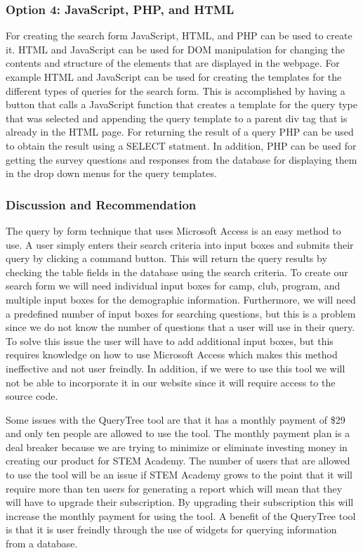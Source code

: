 \documentclass[letterpaper,10pt,serif, draftclsnofoot,onecolumn, compsoc, titlepage]{IEEEtran}
\begin{document}
\subsubsection{Option 4: JavaScript, PHP, and HTML}
For creating the search form JavaScript, HTML, and PHP can be used to create it. HTML and JavaScript can be used for DOM manipulation for changing the contents and structure of the elements that are displayed in the webpage. For example HTML and JavaScript can be used for creating the templates for the different types of queries for the search form. This is accomplished by having a button that calls a JavaScript function that creates a template for the query type that was selected and appending the query template to a parent div tag that is already in the HTML page. For returning the result of a query PHP can be used to obtain the result using a SELECT statment. In addition, PHP can be used for getting the survey questions and responses from the database for displaying them in the drop down menus for the query templates. 

\subsubsection{Discussion and Recommendation}
The query by form technique that uses Microsoft Access is an easy method to use. A user simply enters their search criteria into input boxes and submits their query by clicking a command button. This will return the query results by checking the table fields in the database using the search criteria. To create our search form we will need individual input boxes for camp, club, program, and multiple input boxes for the demographic information. Furthermore, we will need a predefined number of input boxes for searching questions, but this is a problem since we do not know the number of questions that a user will use in their query. To solve this issue the user will have to add additional input boxes, but this requires knowledge on how to use Microsoft Access which makes this method ineffective and not user freindly. In addition, if we were to use this tool we will not be able to incorporate it in our website since it will require access to the source code. 


Some issues with the QueryTree tool are that it has a monthly payment of \$29 and only ten people are allowed to use the tool. The monthly payment plan is a deal breaker because we are trying to minimize or eliminate investing money in creating our product for STEM Academy. The number of users that are allowed to use the tool will be an issue if STEM Academy grows to the point that it will require more than ten users for generating a report which will mean that they will have to upgrade their subscription. By upgrading their subscription this will increase the monthly payment for using the tool. A benefit of the QueryTree tool is that it is user freindly through the use of widgets for querying information from a database. 
\end{document}

